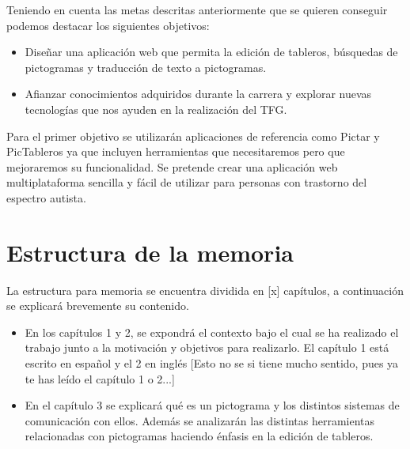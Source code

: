 Teniendo en cuenta las metas descritas anteriormente que se quieren conseguir podemos destacar los siguientes objetivos:
\begin{itemize}
\item Diseñar una aplicación web que permita la edición de tableros, búsquedas de pictogramas y traducción de texto a pictogramas. 

\item Afianzar conocimientos adquiridos durante la carrera y explorar nuevas tecnologías que nos ayuden en la realización del TFG.
\end{itemize}	
Para el primer objetivo se utilizarán aplicaciones de referencia como Pictar y PicTableros ya que incluyen herramientas que necesitaremos pero que mejoraremos su funcionalidad. Se pretende crear una aplicación web multiplataforma sencilla y fácil de utilizar para personas con trastorno del espectro autista. 


\section{Estructura de la memoria}
\label{cap1:sec:Estructura}

La estructura para memoria se encuentra dividida en [x] capítulos, a continuación se explicará brevemente su contenido.
\begin{itemize}
	\item En los capítulos 1 y 2, se expondrá el contexto bajo el cual se ha realizado el trabajo junto a la motivación y objetivos para realizarlo. El capítulo 1 está escrito en español y el 2 en inglés [Esto no se si tiene mucho sentido, pues ya te has leído el capítulo 1 o 2...]
	\item En el capítulo 3 se explicará qué es un pictograma y los distintos sistemas de comunicación con ellos. Además se analizarán las distintas herramientas relacionadas con pictogramas haciendo énfasis en la edición de tableros.
\end{itemize}	




